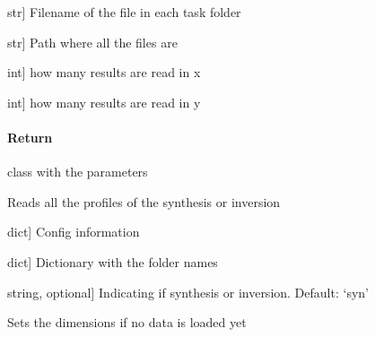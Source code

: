 \documentclass[letterpaper,10pt,english]{sphinxmanual}
\begin{document}
\begin{fulllineitems}
\begin{fulllineitems}
\begin{description}
\sphinxlineitem{filename}{[}str{]}
\sphinxAtStartPar
Filename of the file in each task folder

\sphinxlineitem{path}{[}str{]}
\sphinxAtStartPar
Path where all the files are

\sphinxlineitem{nx}{[}int{]}
\sphinxAtStartPar
how many results are read in x

\sphinxlineitem{ny}{[}int{]}
\sphinxAtStartPar
how many results are read in y

\end{description}


\paragraph{Return}
\label{\detokenize{classes:id40}}
\sphinxAtStartPar
class with the parameters

\end{fulllineitems}


\begin{fulllineitems}
\label{\detokenize{classes:profile_stk.Profile.read_results_MC}}
\pysigstartsignatures
{}
\pysigstopsignatures
\sphinxAtStartPar
Reads all the profiles of the synthesis or inversion
\begin{description}
\sphinxlineitem{config}{[}dict{]}
\sphinxAtStartPar
Config information

\sphinxlineitem{tasks}{[}dict{]}
\sphinxAtStartPar
Dictionary with the folder names

\sphinxlineitem{Type}{[}string, optional{]}
\sphinxAtStartPar
Indicating if synthesis or inversion. Default: ‘syn’

\end{description}

\end{fulllineitems}


\begin{fulllineitems}
\label{\detokenize{classes:profile_stk.Profile.set_dim}}
\pysigstartsignatures
{}
\pysigstopsignatures
\sphinxAtStartPar
Sets the dimensions if no data is loaded yet



\end{fulllineitems}
\end{fulllineitems}
\end{document}
